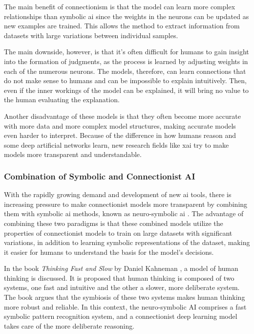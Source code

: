 The main benefit of connectionism is that the model can learn more complex relationships than symbolic \gls{ai} since the weights in the neurons can be updated as new examples are trained. This allows the method to extract information from datasets with large variations between individual samples.

The main downside, however, is that it's often difficult for humans to gain insight into the formation of judgments, as the process is learned by adjusting weights in each of the numerous neurons.
The models, therefore, can learn connections that do not make sense to humans and can be impossible to explain intuitively. Then, even if the inner workings of the model can be explained, it will bring no value to the human evaluating the explanation.


Another disadvantage of these models is that they often become more accurate with more data and more complex model structures, making accurate models even harder to interpret. Because of the difference in how humans reason and some deep artificial networks learn, new research fields like \gls{xai} try to make models more transparent and understandable.


    \subsubsection{Combination of Symbolic and Connectionist AI}
    With the rapidly growing demand and development of new \gls{ai} tools, there is increasing pressure to make connectionist models more transparent by combining them with symbolic \gls{ai} methods, known as neuro-symbolic \gls{ai} \cite{valiantKnowledgeInfusionPursuit2008}. The advantage of combining these two paradigms is that these combined models utilize the properties of connectionist models to train on large datasets with significant variations, in addition to learning symbolic representations of the dataset, making it easier for humans to understand the basis for the model's decisions.

    In the book \textit{Thinking Fast and Slow} by Daniel Kahneman \cite{kahnemanThinkingFastSlow2013}, a model of human thinking is discussed. It is proposed that human thinking is composed of two systems, one fast and intuitive and the other a slower, more deliberate system. The book argues that the symbiosis of these two systems makes human thinking more robust and reliable. In this context, the neuro-symbolic AI comprises a fast symbolic pattern recognition system, and a connectionist deep learning model takes care of the more deliberate reasoning.  
    
